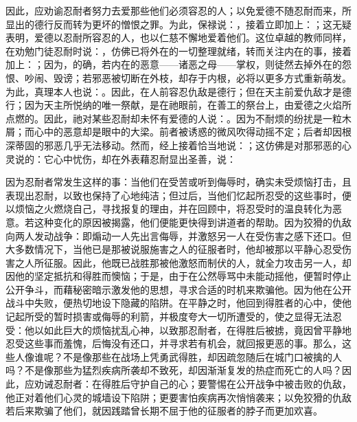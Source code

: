 因此，应劝谕忍耐者努力去爱那些他们必须容忍的人；以免爱德不随忍耐而来，所显出的德行反而转为更坏的憎恨之罪。为此，保禄说：，接着立即加上：；这无疑表明，爱德以忍耐所容忍的人，也以仁慈不懈地爱着他们。这位卓越的教师同样，在劝勉门徒忍耐时说：，仿佛已将外在的一切整理就绪，转而关注内在的事，接着加上：；因为，的确，若内在的恶意——诸恶之母——掌权，则徒然去掉外在的怨恨、吵闹、毁谤；若邪恶被切断在外枝，却存于内根，必将以更多方式重新萌发。为此，真理本人也说：。因此，在人前容忍仇敌是德行；但在天主前爱仇敌才是德行；因为天主所悦纳的唯一祭献，是在祂眼前，在善工的祭台上，由爱德之火焰所点燃的。因此，祂对某些忍耐却未怀有爱德的人说：。因为不耐烦的纷扰是一粒木屑；而心中的恶意却是眼中的大梁。前者被诱惑的微风吹得动摇不定；后者却因根深蒂固的邪恶几乎无法移动。然而，经上接着恰当地说：；这仿佛是对那邪恶的心灵说的：它心中忧伤，却在外表藉忍耐显出圣善，说：\par

因为忍耐者常发生这样的事：当他们在受苦或听到侮辱时，确实未受烦恼打击，且表现出忍耐，以致也保持了心地纯洁；但过后，当他们忆起所忍受的这些事时，便以烦恼之火燃烧自己，寻找报复的理由，并在回顾中，将忍受时的温良转化为恶意。若这种变化的原因被揭露，他们便能更快得到讲道者的帮助。因为狡猾的仇敌向两人发动战争：即煽动一人先出言侮辱，并激怒另一人在受伤害之感下还口。但大多数情况下，当他已是那被说服施害之人的征服者时，他却被那以平静心忍受伤害之人所征服。因此，他既已战胜那被他激怒而制伏的人，就全力攻击另一人，却因他的坚定抵抗和得胜而懊恼；于是，由于在公然辱骂中未能动摇他，便暂时停止公开争斗，而藉秘密暗示激发他的思想，寻求合适的时机来欺骗他。因为他在公开战斗中失败，便热切地设下隐藏的陷阱。在平静之时，他回到得胜者的心中，使他记起所受的暂时损害或侮辱的利箭，并极度夸大一切所遭受的，使之显得无法忍受：他以如此巨大的烦恼扰乱心神，以致那忍耐者，在得胜后被掳，竟因曾平静地忍受这些事而羞愧，后悔没有还口，并寻求若有机会，就回报更恶的事。那么，这些人像谁呢？不是像那些在战场上凭勇武得胜，却因疏忽随后在城门口被擒的人吗？不是像那些为猛烈疾病所袭却不致死，却因渐渐复发的热症而死亡的人吗？因此，应劝诫忍耐者：在得胜后守护自己的心；要警惕在公开战争中被击败的仇敌，他正对着他们心灵的城墙设下陷阱；更要害怕疾病再次悄悄袭来；以免狡猾的仇敌若后来欺骗了他们，就因践踏曾长期不屈于他的征服者的脖子而更加欢喜。\par

